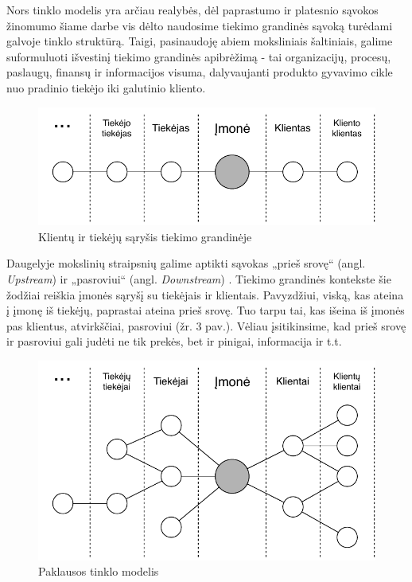 Nors tinklo modelis yra arčiau realybės, dėl paprastumo ir platesnio sąvokos žinomumo šiame darbe vis dėlto naudosime tiekimo grandinės sąvoką turėdami galvoje tinklo struktūrą. Taigi, pasinaudoję abiem moksliniais šaltiniais, galime suformuluoti išvestinį tiekimo grandinės apibrėžimą - tai organizacijų, procesų, paslaugų, finansų ir informacijos visuma, dalyvaujanti produkto gyvavimo cikle nuo pradinio tiekėjo iki galutinio kliento.

\begin{figure}[H]
    \centering
    \includegraphics[scale=1]{images/client-supplier-model}
    \caption{Klientų ir tiekėjų sąryšis tiekimo grandinėje}
\end{figure}

Daugelyje mokslinių straipsnių galime aptikti sąvokas „prieš srovę“ (angl. \textit{Upstream}) ir „pasroviui“ (angl. \textit{Downstream}) \cite{croson2005upstream} \cite{frohlich2001arcs} \cite{vachon2006extending}. Tiekimo grandinės kontekste šie žodžiai reiškia įmonės sąryšį su tiekėjais ir klientais. Pavyzdžiui, viską, kas ateina į įmonę iš tiekėjų, paprastai ateina prieš srovę. Tuo tarpu tai, kas išeina iš įmonės pas klientus, atvirkščiai, pasroviui \cite{christopher2016logistics} (žr. 3 pav.). Vėliau įsitikinsime, kad prieš srovę ir pasroviui gali judėti ne tik prekės, bet ir pinigai, informacija ir t.t.

\begin{figure}[H]
    \centering
    \includegraphics[scale=1]{images/demand-network-model}
    \caption{Paklausos tinklo modelis}
\end{figure}

